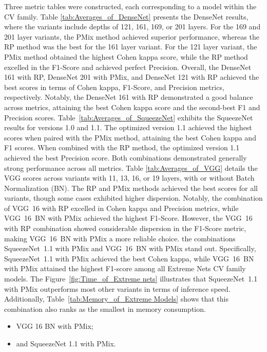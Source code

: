 Three metric tables were constructed, each corresponding to a model within the \gls{CV} family.
Table \ref{tab:Averages_of_DenseNet} presents the DenseNet results, where the variants include depths of 121, 161, 169, or 201 layers. For the 169 and 201 layer variants, the \gls{PMix} method achieved superior performance, whereas the \gls{RP} method was the best for the 161 layer variant. For the 121 layer variant, the \gls{PMix} method obtained the highest Cohen kappa score, while the \gls{RP} method excelled in the F1-Score and achieved perfect Precision. Overall, the DenseNet 161 with \gls{RP}, DenseNet 201 with \gls{PMix}, and DenseNet 121 with \gls{RP} achieved the best scores in terms of Cohen kappa, F1-Score, and Precision metrics, respectively. Notably, the DenseNet 161 with \gls{RP} demonstrated a good balance across metrics, attaining the best Cohen kappa score and the second-best F1 and Precision scores.
Table~\ref{tab:Averages_of_SqueezeNet} exhibits the SqueezeNet results for versions 1.0 and 1.1. The optimized version 1.1 achieved the highest scores when paired with the \gls{PMix} method, attaining the best Cohen kappa and F1 scores. When combined with the \gls{RP} method, the optimized version 1.1 achieved the best Precision score. Both combinations demonstrated generally strong performance across all metrics.
Table \ref{tab:Averages_of_VGG} details the VGG scores across variants with 11, 13, 16, or 19 layers, with or without Batch Normalization (BN). The \gls{RP} and \gls{PMix} methods achieved the best scores for all variants, though some cases exhibited higher dispersion. Notably, the combination of \mbox{VGG 16} with \gls{RP} excelled in Cohen kappa and Precision metrics, while \mbox{VGG 16 BN} with \gls{PMix} achieved the highest F1-Score. However, the \mbox{VGG 16} with \gls{RP} combination showed considerable dispersion in the F1-Score metric, making \mbox{VGG 16 BN} with \gls{PMix} a more reliable choice.
the combinations \mbox{SqueezeNet 1.1} with \gls{PMix} and \mbox{VGG 16 BN} with \gls{PMix} stand out. Specifically, \mbox{SqueezeNet 1.1} with \gls{PMix} achieved the best Cohen kappa, while \mbox{VGG 16 BN} with \gls{PMix} attained the highest F1-score among all Extreme Nets \gls{CV} family models. The Figure~\ref{fig:Time_of_Extreme nets} illustrates that \mbox{SqueezeNet 1.1} with \gls{PMix} outperforms most other variants in terms of inference speed. Additionally, Table~\ref{tab:Memory_of_Extreme Models} shows that this combination also ranks as the smallest in memory consumption.  
\begin{itemize}
	\item VGG 16 BN with \gls{PMix};
	\item and SqueezeNet 1.1 with \gls{PMix}.
\end{itemize}


